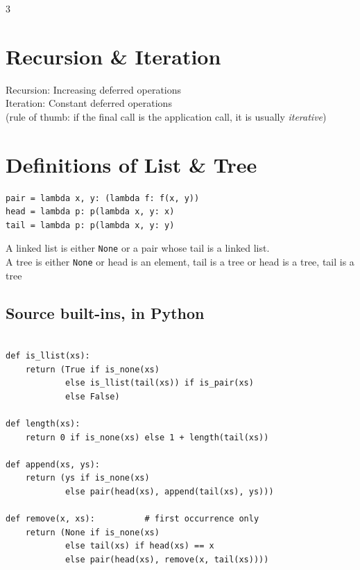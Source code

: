 \documentclass[9pt,landscape]{extarticle}
\newcommand{\hl}[1]{\textcolor{accent}{#1}}
\newcommand{\hll}[1]{\textcolor{accent2}{#1}}
\newcommand{\kw}[1]{\textcolor{kw}{\texttt{#1}}}
\begin{document}
\begin{multicols*}{3}


\section*{Recursion \& Iteration}
Recursion: \hl{Increasing} deferred operations\\
Iteration: \textcolor{kw}{Constant} deferred operations\\
(rule of thumb: if the final call is the application call, it is usually \emph{iterative})

\section*{Definitions of List \& Tree}
\begin{lstlisting}
pair = lambda x, y: (lambda f: f(x, y))
head = lambda p: p(lambda x, y: x)
tail = lambda p: p(lambda x, y: y)
\end{lstlisting}

A linked list is either \kw{None} or \hl{a pair whose tail is a linked list.}\\
A tree is either \kw{None} or \hl{head is an element, tail is a tree} or \hll{head is a tree, tail is a tree}

\subsection*{Source built-ins, in Python}
\begin{lstlisting}

def is_llist(xs):
    return (True if is_none(xs)
            else is_llist(tail(xs)) if is_pair(xs)
            else False)

def length(xs):
    return 0 if is_none(xs) else 1 + length(tail(xs))

def append(xs, ys):
    return (ys if is_none(xs)
            else pair(head(xs), append(tail(xs), ys)))

def remove(x, xs):          # first occurrence only
    return (None if is_none(xs)
            else tail(xs) if head(xs) == x
            else pair(head(xs), remove(x, tail(xs))))
\end{lstlisting}


\end{multicols*}
\end{document}
